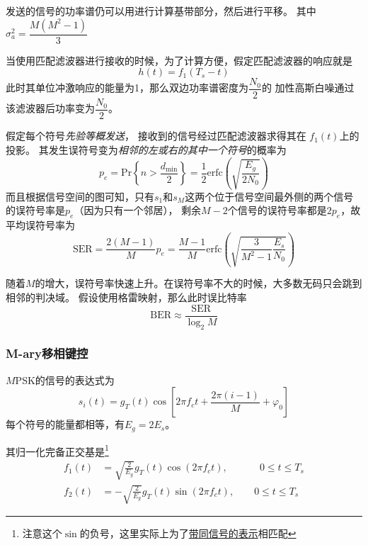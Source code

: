     发送的信号的功率谱仍可以用进行计算基带部分，然后进行平移。
    其中$\sigma_a^2=\dfrac{M(M^2-1)}{3}$

    当使用匹配滤波器进行接收的时候，为了计算方便，假定匹配滤波器的响应就是
    \begin{equation}
        h(t)=f_1(T_s-t)
    \end{equation}
    此时其单位冲激响应的能量为1，那么双边功率谱密度为$\dfrac{N_0}{2}$的
    加性高斯白噪通过该滤波器后功率变为$\dfrac{N_0}{2}$。

    假定每个符号\emph{先验等概发送}，
    接收到的信号经过匹配滤波器求得其在 $f_1(t)$上的投影。
    其发生误符号变为\emph{相邻的左或右的其中一个符号}的概率为
    \begin{equation}
        p_e=\mathrm{Pr}\left\{n>\frac{d_\text{min}}{2}\right\}=\frac{1}{2}\text{erfc}\left(\sqrt{\frac{E_g}{2N_0}}\right)
    \end{equation}
    而且根据信号空间的图可知，只有$s_1$和$s_{M}$这两个位于信号空间最外侧的两个信号的误符号率是$p_e$（因为只有一个邻居），
    剩余$M-2$个信号的误符号率都是$2p_e$，故平均误符号率为
    \begin{equation}
        \mathrm{SER}=\frac{2(M-1)}{M}p_e=\frac{M-1}{M}\text{erfc}\left(\sqrt{\frac{3}{M^2-1}\frac{E_s}{N_0}}\right)
    \end{equation}

    随着$M$的增大，误符号率快速上升。在误符号率不大的时候，大多数无码只会跳到相邻的判决域。
    假设使用格雷映射，那么此时误比特率
    \begin{equation}
        \textrm{BER}\approx \frac{\mathrm{SER}}{\log_2M}
    \end{equation}

    \subsubsection{M-ary移相键控}
    $M$PSK的信号的表达式为
    \begin{equation}
        s_i(t)=g_T(t)\cos\left[2\pi f_ct+\frac{2\pi(i-1)}{M}+\varphi_0\right]
    \end{equation}
    每个符号的能量都相等，有$E_g=2E_s$。

    其归一化完备正交基是\footnote{注意这个$\sin$的负号，这里实际上为了\hyperref[eq:baoluo]{带同信号的表示}相匹配}
    \begin{align}
        f_1(t)&=\sqrt{\frac{2}{E_g}}g_T(t)\cos(2\pi f_ct),\phantom{-}\hspace{2em}0\leq t\leq T_s\\
        f_2(t)&=-\sqrt{\frac{2}{E_g}}g_T(t)\sin(2\pi f_ct),\hspace{2em}0\leq t\leq T_s
    \end{align}

